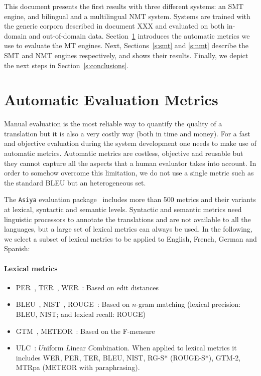 \documentclass[a4paper,11pt]{article}
\begin{document}
This document presents the first results with three different systems: an SMT engine, and bilingual and a multilingual NMT system. Systems are trained with the generic corpora described in document XXX and evaluated on both in-domain and out-of-domain data. Section~\ref{s:eval} introduces the automatic metrics we use to evaluate the MT engines. Next, Sections~\ref{s:smt} and \ref{s:nmt} describe the SMT and NMT engines respectively, and shows their results. Finally, we depict the next steps in Section~\ref{s:conclusions}.


\section{Automatic Evaluation Metrics}
\label{s:eval}

Manual evaluation is the most reliable way to quantify the quality of a translation but it is also a very costly way (both in time and money). For a fast and objective evaluation during the system development one needs to make use of automatic metrics. Automatic metrics are costless, objective and reusable but they cannot capture all the aspects that a human evaluator takes into account. In order to somehow overcome this limitation, we do not use a single metric such as the standard BLEU but an heterogeneous set.

The {\tt Asiya} evaluation package~\cite{PBML_Asiya:2010, Gonzalez:2012} includes more than 500 metrics and their variants at lexical, syntactic and semantic levels. Syntactic and semantic metrics need linguistic processors to annotate the translations and are not available to all the languages, but a large set of lexical metrics can always be used. In the following, we select a subset of lexical metrics to be applied to English, French, German and Spanish:

\paragraph{Lexical metrics} 
\begin{itemize}
 \item PER~\cite{PER}, TER~\cite{TER}, WER~\cite{WER}: Based on edit distances
 \item BLEU~\cite{papineni2002}, NIST~\cite{NISTmetric}, ROUGE~\cite{ROUGE}: Based on $n$-gram matching (lexical precision: BLEU, NIST; and lexical recall: ROUGE)
 \item GTM~\cite{GTM}, METEOR~\cite{METEOR}: Based on the F-measure
 \item ULC~\cite{ULC}: $U$niform $L$inear $C$ombination. When applied to lexical metrics it includes WER, PER, TER, BLEU, NIST, 
 RG-S* (ROUGE-S*), GTM-2, MTRpa (METEOR with paraphrasing). 
\end{itemize}
\end{document}
